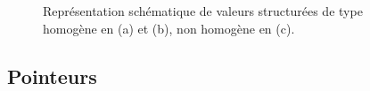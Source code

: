 \documentclass[a4paper,francais]{insalyon}
\begin{document}
\begin{figure}[htbp]
{  }
  \parbox[b]{7cm}{
  }
  \caption{Représentation schématique de valeurs structurées de type homogène en (a) et (b), non homogène en (c).}  
  \label{fig:types}
\end{figure}



\subsection{Pointeurs}
\end{document}
